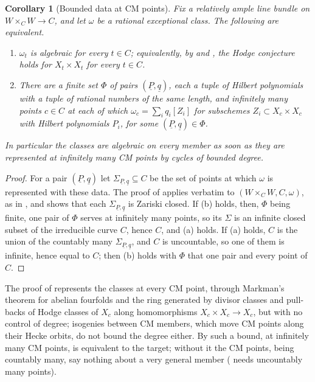\documentclass[11pt,reqno]{amsart}
\theoremstyle{plain}
\newtheorem{corollary}[theorem]{Corollary}
\theoremstyle{definition}
\theoremstyle{remark}
\begin{document}
\begin{corollary}[Bounded data at CM points]\label{cor:mumfordbounded}
Fix a relatively ample line bundle on $W\times_{C}W\to C$, and let $\omega$ be
a rational exceptional class. The following are equivalent.
\begin{enumerate}[label=\textup{(\alph*)},leftmargin=2.6em,itemsep=2pt]
\item $\omega_{t}$ is algebraic for every $t\in C$; equivalently, by
   and , the Hodge conjecture
  holds for $X_{t}\times X_{t}$ for every $t\in C$.
\item There are a finite set $\Phi$ of pairs $(\underline{P},\underline{q})$,
  each a tuple of Hilbert polynomials with a tuple of rational numbers of the
  same length, and infinitely many points $c\in C$ at each of which
  $\omega_{c}=\sum_{i}q_{i}[Z_{i}]$ for subschemes $Z_{i}\subset X_{c}\times
  X_{c}$ with Hilbert polynomials $P_{i}$, for some $(\underline{P},
  \underline{q})\in\Phi$.
\end{enumerate}
In particular the classes are algebraic on every member as soon as they are
represented at infinitely many CM points by cycles of bounded degree.
\end{corollary}

\begin{proof}
For a pair $(\underline{P},\underline{q})$ let $\Sigma_{\underline{P},
\underline{q}}\subseteq C$ be the set of points at which $\omega$ is
represented with these data. The proof of \cite[Theorem~16.4]{paperI} applies
verbatim to $(W\times_{C}W,C,\omega)$, as in , and shows
that each $\Sigma_{\underline{P},\underline{q}}$ is Zariski closed. If (b)
holds, then, $\Phi$ being finite, one pair of $\Phi$ serves at infinitely
many points, so its $\Sigma$ is an infinite closed subset of the irreducible
curve $C$, hence $C$, and (a) holds. If (a) holds, $C$ is the union of the
countably many $\Sigma_{\underline{P},\underline{q}}$, and $C$ is
uncountable, so one of
them is infinite, hence equal to $C$; then (b) holds with $\Phi$ that one
pair and every point of $C$.
\end{proof}

The proof of  represents the classes at every CM point,
through Markman's theorem for abelian fourfolds \cite{Mar25a} and the ring
generated by divisor classes and pull-backs of Hodge classes of $X_{c}$ along
homomorphisms $X_{c}\times X_{c}\to X_{c}$, but with no control of degree;
isogenies between CM members, which move CM points along their Hecke orbits,
do not bound the degree either. By
 such a bound, at infinitely many CM points, is
equivalent to the target; without it the CM points, being countably many,
say nothing about a very general member ( needs
uncountably many points).
\end{document}
